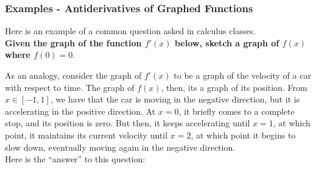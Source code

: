 \documentclass[10pt]{article}
\newcommand{\emptyline}[0]{\\\hfill$~$\\}
\begin{document}
\subsubsection{Examples - Antiderivatives of Graphed Functions}
Here is an example of a common question asked in calculus classes. \\
\textbf{Given the graph of the function $f'(x)$ below, sketch a graph of $f(x)$ where $f(0)=0$}.
\begin{center}
\end{center}
As an analogy, consider the graph of $f'(x)$ to be a graph of the velocity of a car with respect to time. The graph of $f(x)$, then, its a graph of its position. From $x\in[-1,1]$, we have that the car is moving in the negative direction, but it is accelerating in the positive direction. At $x=0$, it briefly comes to a complete stop, and its position is zero. But then, it keeps accelerating until $x=1$, at which point, it maintains its current velocity until $x=2$, at which point it begins to slow down, eventually moving again in the negative direction.\emptyline
Here is the ``answer'' to this question:
\begin{center}
\end{center}
\end{document}
